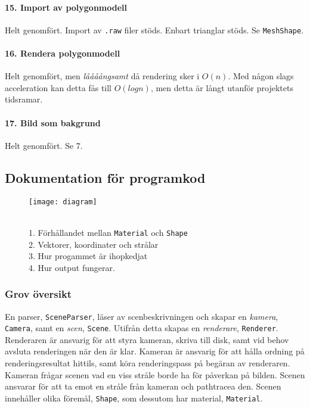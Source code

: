 \documentclass{article}
\begin{document}
\paragraph{15. Import av polygonmodell}
Helt genomfört. Import av \texttt{.raw} filer stöds. Enbart trianglar stöds.
Se \texttt{MeshShape}.

\paragraph{16. Rendera polygonmodell}
Helt genomfört, men \emph{låååångsamt} då rendering sker i $O(n)$. Med
någon slags acceleration kan detta fås till $O(log n)$, men detta är
långt utanför projektets tidsramar.

\paragraph{17. Bild som bakgrund}
Helt genomfört. Se 7.

\subsection{Dokumentation för programkod}

\begin{figure}
  \begin{centere}
    \texttt{[image: diagram]}
  \end{centere}
\caption{\\ 1. Förhållandet mellan \texttt{Material} och \texttt{Shape} \\
  2. Vektorer, koordinater och strålar \\
  3. Hur progammet är ihopkedjat \\
  4. Hur output fungerar. }
\end{figure}
\subsubsection{Grov översikt}
En parser, \texttt{SceneParser}, läser av scenbeskrivningen och skapar
en \emph{kamera}, \texttt{Camera}, samt en \emph{scen},
\texttt{Scene}. Utifrån detta skapas en \emph{renderare},
\texttt{Renderer}. Renderaren är ansvarig för att styra kameran,
skriva till disk, samt vid behov avsluta renderingen när den är
klar. Kameran är ansvarig för att hålla ordning på renderingsresultat
hittils, samt köra renderingspass på begäran av renderaren. Kameran
frågar scenen vad en viss stråle borde ha för påverkan på
bilden. Scenen ansvarar för att ta emot en stråle från kameran och
pathtracea den. Scenen innehåller olika föremål, \texttt{Shape}, som
dessutom har material, \texttt{Material}.
\end{document}

